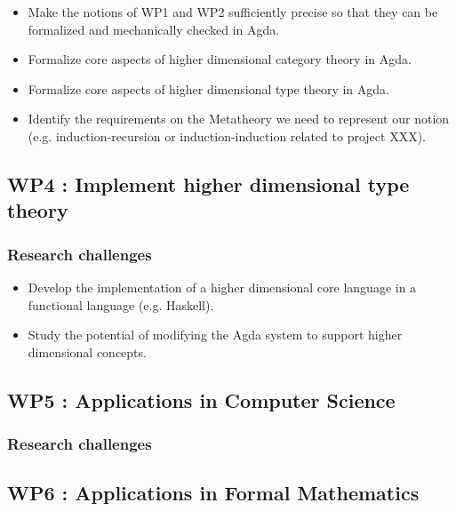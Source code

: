 \documentclass[a4paper]{article}
\begin{document}
\begin{itemize}
\item Make the notions of WP1 and WP2 sufficiently precise so that they
  can be formalized and mechanically checked in Agda.

\item Formalize core aspects of higher dimensional category theory in
  Agda.

\item Formalize core aspects of higher dimensional type theory in Agda.

\item Identify the requirements on the Metatheory we need to represent
  our notion (e.g. induction-recursion or induction-induction related
  to project XXX).

\end{itemize}

\subsection*{WP4 : Implement higher dimensional type theory} 
\label{sec:wp:qio}

\subsubsection*{Research challenges}
\label{sec:rsearch-challenges}

\begin{itemize}
\item Develop the implementation of a higher dimensional core language
  in a functional language (e.g. Haskell).

\item Study the potential of modifying the Agda system to support
  higher dimensional concepts.
  
\end{itemize}


\subsection*{WP5 : Applications in Computer Science} 
\label{sec:wp:qio}

\subsubsection*{Research challenges}
\label{sec:rsearch-challenges}

\subsection*{WP6 : Applications in Formal Mathematics} 
\label{sec:wp:qio}
\end{document}
